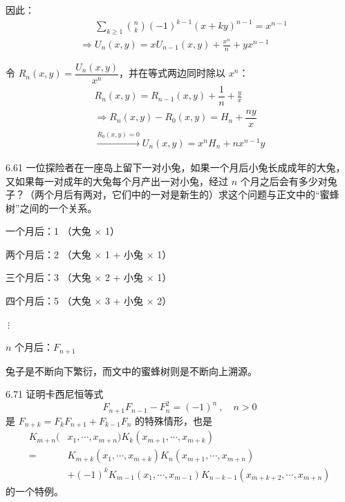 因此：
\begin{align*}
  &\phantom{\Rightarrow} \sum_{k \ge 1} \binom{n}{k} (-1)^{k-1} (x+ky)^{n-1} = x^{n-1} \\
  &\Rightarrow U_n (x, y) = x U_{n-1} (x, y) + \frac{x^n}{n} + y x^{n-1}
\end{align*}

令 \( R_n (x, y) = \dfrac{U_n (x, y)}{x^n} \)，并在等式两边同时除以 \( x^n \)：
\begin{gather*}
  R_n (x, y) = R_{n-1} (x, y) + \dfrac{1}{n} + \frac{y}{x} \\
  \Rightarrow R_n (x, y) - R_0 (x, y) = H_n + \dfrac{ny}{x} \\
  \xrightarrow{R_0 (x, y) = 0} U_n (x, y) = x^n H_n + n x^{n-1} y
\end{gather*}

\begin{problem}{6.6}{1}
  一位探险者在一座岛上留下一对小兔，如果一个月后小兔长成成年的大兔，又如果每一对成年的大兔每个月产出一对小兔，经过 \( n \) 个月之后会有多少对兔子？（两个月后有两对，它们中的一对是新生的）求这个问题与正文中的“蜜蜂树”之间的一个关系。
\end{problem}

一个月后：1 （大兔 \( \times \) 1）

两个月后：2 （大兔 \( \times \) 1 + 小兔 \( \times \) 1）

三个月后：3 （大兔 \( \times \) 2 + 小兔 \( \times \) 1）

四个月后：5 （大兔 \( \times \) 3 + 小兔 \( \times \) 2）

\( \ \vdots \)

\( n \) 个月后：\( F_{n+1} \)

兔子是不断向下繁衍，而文中的蜜蜂树则是不断向上溯源。

\begin{problem}{6.7}{1}
  证明卡西尼恒等式
  \[
    F_{n+1} F_{n-1} - F_n^2 = (-1)^n \ , \quad n > 0
  \]
  是 \( F_{n+k} = F_k F_{n+1} + F_{k-1} F_n \) 的特殊情形，也是
  \begin{align*}
    K_{m+n}(&x_1, \cdots, x_{m+n}) K_k(x_{m+1}, \cdots, x_{m+k}) \\
    = &K_{m+k}(x_1, \cdots, x_{m+k}) K_n(x_{m+1}, \cdots, x_{m+n}) \\
    &+ (-1)^k K_{m-1}(x_1, \cdots, x_{m-1}) K_{n-k-1}(x_{m+k+2}, \cdots, x_{m+n})
  \end{align*}
  的一个特例。
\end{problem}

